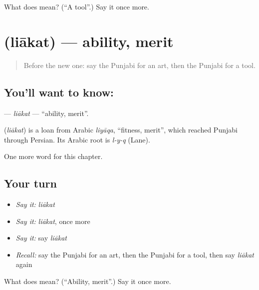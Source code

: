 \begin{tcolorbox}[breakable,colback=teal!4,colframe=teal!35!black,title={Before you move on}]
What does  mean? (\textquotedblleft{}A tool\textquotedblright{}.) Say it once more.
\end{tcolorbox}
\section[\texorpdfstring{\pa{ਲਿਆਕਤ} (liākat)}{ਲਿਆਕਤ (liākat)}]{ (liākat) — ability, merit}

\label{lesson:PA-C112-liakat}



\begin{quote}
Before the new one: say the Punjabi for an art, then the Punjabi for a tool.
\end{quote}

\subsection*{You'll want to know: }
\textbf{} — \emph{liākat} — \textquotedblleft{}ability, merit\textquotedblright{}.

\begin{cousinweb}
\textbf{} (\emph{liākat}) is a loan from Arabic \emph{liyāqa}, \textquotedblleft{}fitness, merit\textquotedblright{}, which reached Punjabi through Persian. Its Arabic root is \emph{l-y-q} (Lane).
\end{cousinweb}

\begin{grammarlens}[title={What you've built}]
One more word for this chapter.
\end{grammarlens}

\subsection*{Your turn}
\begin{itemize}
\raggedright
  \item \emph{Say it:} \emph{liākat}
  \item \emph{Say it:} \emph{liākat}, once more
  \item \emph{Say it:} say \emph{liākat}
  \item \emph{Recall:} say the Punjabi for an art, then the Punjabi for a tool, then say \emph{liākat} again
\end{itemize}

\begin{tcolorbox}[breakable,colback=teal!4,colframe=teal!35!black,title={Before you move on}]
What does  mean? (\textquotedblleft{}Ability, merit\textquotedblright{}.) Say it once more.
\end{tcolorbox}
